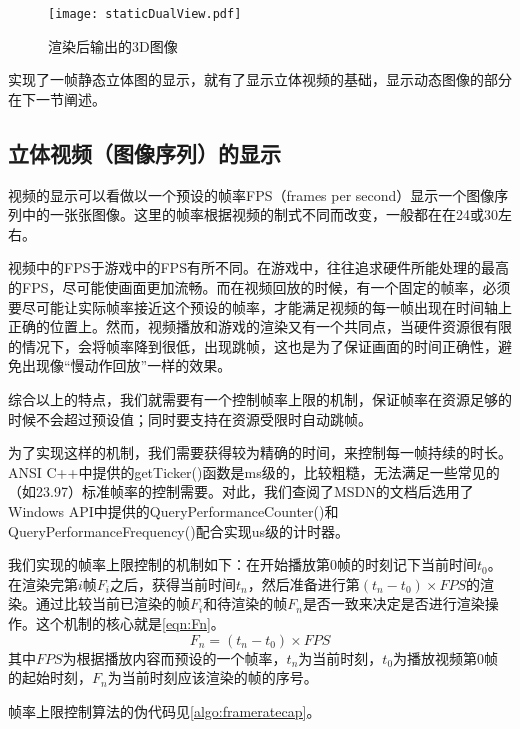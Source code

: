 \begin{figure}[htbp]
\begin{center}
\texttt{[image: staticDualView.pdf]}
\caption{渲染后输出的3D图像}
\label{fig:staticdualview}
\end{center}
\end{figure}

实现了一帧静态立体图的显示，就有了显示立体视频的基础，显示动态图像的部分在下一节阐述。

\subsection{立体视频（图像序列）的显示}
\label{subsec:motion3dimgdisp}

视频的显示可以看做以一个预设的帧率FPS（frames per second）显示一个图像序列中的一张张图像。这里的帧率根据视频的制式不同而改变，一般都在在24或30左右。

视频中的FPS于游戏中的FPS有所不同。在游戏中，往往追求硬件所能处理的最高的FPS，尽可能使画面更加流畅。而在视频回放的时候，有一个固定的帧率，必须要尽可能让实际帧率接近这个预设的帧率，才能满足视频的每一帧出现在时间轴上正确的位置上。然而，视频播放和游戏的渲染又有一个共同点，当硬件资源很有限的情况下，会将帧率降到很低，出现跳帧，这也是为了保证画面的时间正确性，避免出现像“慢动作回放”一样的效果。

综合以上的特点，我们就需要有一个控制帧率上限的机制，保证帧率在资源足够的时候不会超过预设值；同时要支持在资源受限时自动跳帧。

为了实现这样的机制，我们需要获得较为精确的时间，来控制每一帧持续的时长。ANSI C++中提供的getTicker()函数是ms级的，比较粗糙，无法满足一些常见的（如23.97）标准帧率的控制需要。对此，我们查阅了MSDN的文档后选用了Windows API中提供的QueryPerformanceCounter()和QueryPerformanceFrequency()配合实现us级的计时器。

我们实现的帧率上限控制的机制如下：在开始播放第0帧的时刻记下当前时间$t_{0}$。在渲染完第$i$帧$F_{i}$之后，获得当前时间$t_{n}$，然后准备进行第$(t_{n}-t_{0})\times FPS$的渲染。通过比较当前已渲染的帧$F_{i}$和待渲染的帧$F_{n}$是否一致来决定是否进行渲染操作。这个机制的核心就是\autoref{eqn:Fn}。
\begin{equation}\label{eqn:Fn}
F_{n}=(t_{n}-t_{0})\times FPS
\end{equation}
其中$FPS$为根据播放内容而预设的一个帧率，$t_{n}$为当前时刻，$t_{0}$为播放视频第0帧的起始时刻，$F_{n}$为当前时刻应该渲染的帧的序号。

帧率上限控制算法的伪代码见\autoref{algo:frameratecap}。

